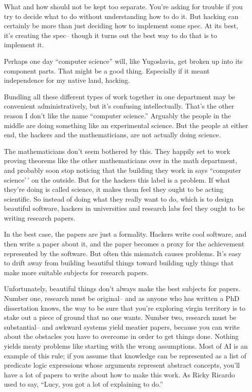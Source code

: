 What and how should not be kept too separate. You're asking for trouble
if you try to decide what to do without understanding how to do it. But
hacking can certainly be more than just deciding how to implement some
spec. At its best, it's creating the spec-- though it turns out the best
way to do that is to implement it.

Perhaps one day ``computer science'' will, like Yugoslavia, get broken
up into its component parts. That might be a good thing. Especially if
it meant independence for my native land, hacking.

Bundling all these different types of work together in one department
may be convenient administratively, but it's confusing intellectually.
That's the other reason I don't like the name ``computer science.''
Arguably the people in the middle are doing something like an
experimental science. But the people at either end, the hackers and the
mathematicians, are not actually doing science.

The mathematicians don't seem bothered by this. They happily set to work
proving theorems like the other mathematicians over in the math
department, and probably soon stop noticing that the building they work
in says ``computer science'\,' on the outside. But for the hackers this
label is a problem. If what they're doing is called science, it makes
them feel they ought to be acting scientific. So instead of doing what
they really want to do, which is to design beautiful software, hackers
in universities and research labs feel they ought to be writing research
papers.

In the best case, the papers are just a formality. Hackers write cool
software, and then write a paper about it, and the paper becomes a proxy
for the achievement represented by the software. But often this mismatch
causes problems. It's easy to drift away from building beautiful things
toward building ugly things that make more suitable subjects for
research papers.

Unfortunately, beautiful things don't always make the best subjects for
papers. Number one, research must be original-- and as anyone who has
written a PhD dissertation knows, the way to be sure that you're
exploring virgin territory is to stake out a piece of ground that no one
wants. Number two, research must be substantial-- and awkward systems
yield meatier papers, because you can write about the obstacles you have
to overcome in order to get things done. Nothing yields meaty problems
like starting with the wrong assumptions. Most of AI is an example of
this rule; if you assume that knowledge can be represented as a list of
predicate logic expressions whose arguments represent abstract concepts,
you'll have a lot of papers to write about how to make this work. As
Ricky Ricardo used to say, ``Lucy, you got a lot of explaining to do.''

